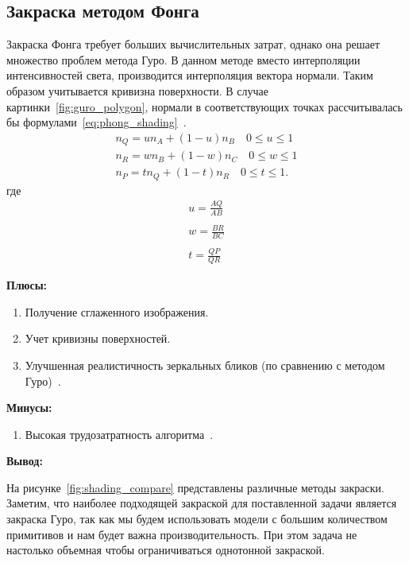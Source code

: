 \subsection{Закраска методом Фонга}
Закраска Фонга требует больших вычислительных затрат, однако она решает множество проблем метода Гуро.
В данном методе вместо интерполяции интенсивностей света, производится интерполяция вектора нормали.
Таким образом учитывается кривизна поверхности.
В случае картинки~\ref{fig:guro_polygon}, нормали в соответствующих точках рассчитывалась бы формулами~\ref{eq:phong_shading}~\cite{Rodgers}.
\begin{equation}
	\label{eq:phong_shading}
	\begin{aligned}
		n_Q = un_A + (1-u)n_B  \quad 0 \leq u \leq 1 \\
		n_R = wn_B + (1-w)n_C  \quad 0 \leq w \leq 1 \\
		n_P = tn_Q + (1-t)n_R  \quad 0 \leq t \leq 1.
	\end{aligned}
\end{equation}
где
\begin{equation}
	\begin{aligned}
		u = \frac{AQ}{AB} \\\\
		w = \frac{BR}{BC} \\\\
		t = \frac{QP}{QR} 
	\end{aligned}
\end{equation}

\textbf{Плюсы:}
\begin{enumerate}
	\item Получение сглаженного изображения.
	\item Учет кривизны поверхностей.
	\item Улучшенная реалистичность зеркальных бликов (по сравнению с методом Гуро)~\cite{Rodgers}.
\end{enumerate}

\textbf{Минусы:}
\begin{enumerate} 
	\item Высокая трудозатратность алгоритма~\cite{Rodgers}.
\end{enumerate}


\textbf{Вывод:}

На рисунке~\ref{fig:shading_compare} представлены различные методы закраски. 
Заметим, что наиболее подходящей закраской для поставленной задачи является закраска Гуро, так как мы будем использовать модели с большим количеством примитивов и нам будет важна производительность. При этом задача не настолько объемная чтобы ограничиваться однотонной закраской.

